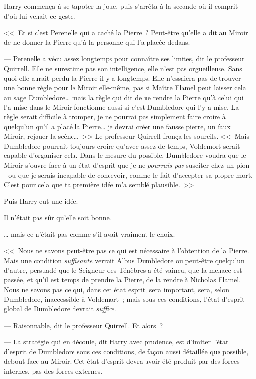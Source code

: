 Harry commença à se tapoter la joue, puis s'arrêta à la seconde où il comprit d'où lui venait ce geste.

<<~Et si c'est Perenelle qui a caché la Pierre~? Peut-être qu'elle a dit au Miroir de ne donner la Pierre qu'à la personne qui l'a placée dedans.

--- Perenelle a vécu assez longtemps pour connaître ses limites, dit le professeur Quirrell. Elle ne surestime pas son intelligence, elle n'est pas orgueilleuse. Sans quoi elle aurait perdu la Pierre il y a longtemps. Elle n'essaiera pas de trouver une bonne règle pour le Miroir elle-même, pas si Maître Flamel peut laisser cela au sage Dumbledore… mais la règle qui dit de ne rendre la Pierre qu'à celui qui l'a mise dans le Miroir fonctionne aussi si c'est Dumbledore qui l'y a mise. La règle serait difficile à tromper, je ne pourrai pas simplement faire croire à quelqu'un qu'il a placé la Pierre… je devrai créer une fausse pierre, un faux Miroir, rejouer la scène…~>> Le professeur Quirrell fronça les sourcils. <<~Mais Dumbledore pourrait toujours croire qu'avec assez de temps, Voldemort serait capable d'organiser cela. Dans le mesure du possible, Dumbledore voudra que le Miroir s'ouvre face à un état d'esprit que je ne \emph{pourrais pas} susciter chez un pion - ou que je serais incapable de concevoir, comme le fait d'accepter sa propre mort. C'est pour cela que ta première idée m'a semblé plausible.~>>

Puis Harry eut une idée.

Il n'était pas sûr qu'elle soit bonne.

… mais ce n'était pas comme s'il avait vraiment le choix.

<<~Nous ne savons peut-être pas ce qui est nécessaire à l'obtention de la Pierre. Mais une condition \emph{suffisante} verrait Albus Dumbledore ou peut-être quelqu'un d'autre, persuadé que le Seigneur des Ténèbres a été vaincu, que la menace est passée, et qu'il est temps de prendre la Pierre, de la rendre à Nicholas Flamel. Nous ne savons pas ce qui, dans cet état esprit, sera important, sera, selon Dumbledore, inaccessible à Voldemort~; mais sous ces conditions, l'état d'esprit global de Dumbledore devrait \emph{suffire}.

--- Raisonnable, dit le professeur Quirrell. Et alors~?

--- La stratégie qui en découle, dit Harry avec prudence, est d'imiter l'état d'esprit de Dumbledore sous ces conditions, de façon aussi détaillée que possible, debout face au Miroir. Cet état d'esprit devra avoir été produit par des forces internes, pas des forces externes.

